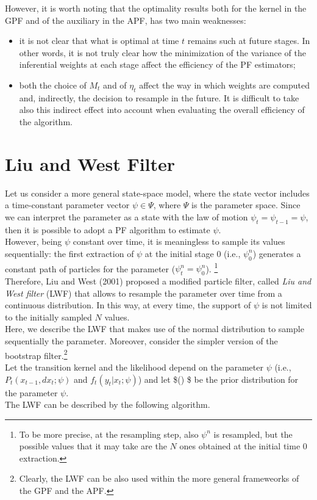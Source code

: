 \documentclass[
]{book}
\theoremstyle{break}
\theoremstyle{nonumberplain}
\begin{document}
However, it is worth noting that the optimality results both for the
kernel in the GPF and of the auxiliary in the APF, has two main
weaknesses:

\begin{itemize}
    \item it is not clear that what is optimal at time $t$ remains such at future stages. In other words, it is not truly clear how the minimization of the variance of the inferential weights at each stage affect the efficiency of the PF estimators;
    \item both the choice of $M_t$ and of $\eta_t$ affect the way in which weights are computed and, indirectly, the decision to resample in the future. It is difficult to take also this indirect effect into account when evaluating the  overall efficiency of the algorithm.
\end{itemize}

\section{Liu and West Filter}\label{pf_lui_west}

Let us consider a more general state-space model, where the state vector
includes a time-constant parameter vector \(\psi \in \Psi\), where
\(\Psi\) is the parameter space. Since we can interpret the parameter as
a state with the law of motion \(\psi_t=\psi_{t-1}=\psi\), then it is
possible to adopt a PF algorithm to estimate \(\psi\).\\
However, being \(\psi\) constant over time, it is meaningless to sample
its values sequentially: the first extraction of \(\psi\) at the initial
stage 0 (i.e., \(\psi_0^n\)) generates a constant path of particles for
the parameter (\(\psi_t^n=\psi_0^n\)).
\footnote{To be more precise, at the resampling step, also $\psi^n$ is resampled, but the possible values that it may take are the $N$ ones obtained at the initial time 0 extraction.}\\
Therefore, Liu and West (2001) proposed a modified particle filter,
called \textit{Liu and West filter} (LWF) that allows to resample the
parameter over time from a continuous distribution. In this way, at
every time, the support of \(\psi\) is not limited to the initially
sampled \(N\) values.\\
Here, we describe the LWF that makes use of the normal distribution to
sample sequentially the parameter. Moreover, consider the simpler
version of the bootstrap
filter.\footnote{Clearly, the LWF can be also used within the more general frameweorks of the GPF and the APF.}\\
Let the transition kernel and the likelihood depend on the parameter
\(\psi\) (i.e., \(P_t(x_{t-1},dx_t;\psi)\) and \(f_t(y_t|x_t;\psi)\))
and let \$\pi(\cdot) \$ be the prior distribution for the parameter
\(\psi\).\\
The LWF can be described by the following algorithm.
\end{document}
